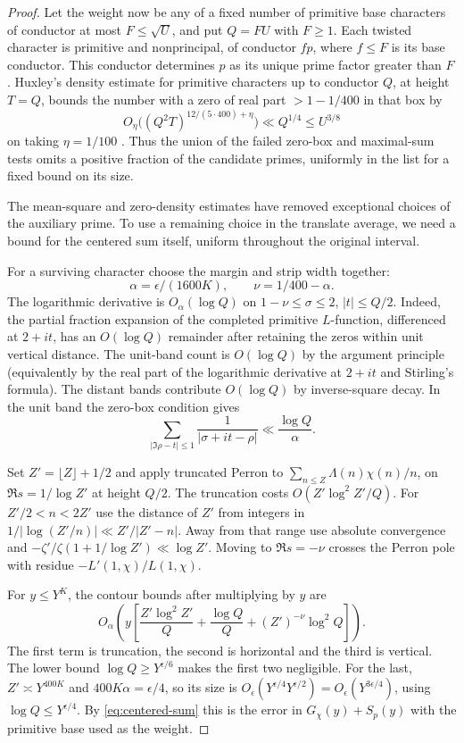 \begin{proof}
Let the weight now be any of a fixed number of primitive base
characters of conductor at most \(F\le\sqrt U\), and put \(Q=FU\)
with \(F\ge1\). Each twisted character is primitive and
nonprincipal, of conductor \(fp\), where \(f\le F\) is its base
conductor. This conductor determines \(p\) as its unique prime
factor greater than \(F\). Huxley's density estimate for primitive
characters up to conductor \(Q\), at height \(T=Q\), bounds the
number with a zero of real part \(>1-1/400\) in that box by
\[
 O_\eta\big((Q^2 T)^{12/(5\cdot400)+\eta}\big)
                 \ll Q^{1/4}\le U^{3/8}
\]
on taking \(\eta=1/100\) \cite[(1.1)]{huxley}. Thus the union of
the failed zero-box and maximal-sum tests omits a positive
fraction of the candidate primes, uniformly in the list for a
fixed bound on its size.

The mean-square and zero-density estimates have removed exceptional choices of the auxiliary prime. To use a remaining choice in the translate average, we need a bound for the centered sum itself, uniform throughout the original interval.

For a surviving character choose the margin and strip width together:
\[
 \alpha=\epsilon/(1600K),\qquad \nu=1/400-\alpha.
\]
The logarithmic derivative is
\(O_\alpha(\log Q)\) on \(1-\nu\le\sigma\le 2\),
\(|t|\le Q/2\). Indeed, the partial fraction expansion of the
completed primitive \(L\)-function, differenced at \(2+it\),
has an \(O(\log Q)\) remainder after retaining the zeros within
unit vertical distance. The unit-band count is \(O(\log Q)\)
by the argument principle (equivalently by the real part of the
logarithmic derivative at \(2+it\) and Stirling's formula).
The distant bands contribute \(O(\log Q)\) by inverse-square decay. In the unit band the zero-box condition gives
\[
 \sum_{|\Im\rho-t|\le1}\frac{1}{|\sigma+it-\rho|}\ll \frac{\log Q}{\alpha}.
\]


Set \(Z'=\lfloor Z\rfloor+1/2\) and apply truncated Perron to
\(\sum_{n\le Z}\Lambda(n)\chi(n)/n\), on
\(\Re s=1/\log Z'\) at height \(Q/2\). The truncation costs
\(O(Z'\log^2 Z'/Q)\). For \(Z'/2<n<2Z'\) use the
distance of \(Z'\) from integers in
\(1/|\log(Z'/n)|\ll Z'/|Z'-n|\). Away from that range use
absolute convergence and \(-\zeta'/\zeta(1+1/\log Z')
\ll\log Z'\). Moving to \(\Re s=-\nu\) crosses the Perron pole
with residue \(-L'(1,\chi)/L(1,\chi)\).

For \(y\le Y^K\), the contour bounds after multiplying by \(y\) are
\[
 O_\alpha\!\left(y\left[
   \frac{Z'\log^2Z'}{Q}
   +\frac{\log Q}{Q}
   +(Z')^{-\nu}\log^2 Q\right]\right).
\]
The first term is truncation, the second is horizontal and the third
is vertical. The lower bound \(\log Q\ge Y^{\epsilon/6}\) makes
the first two negligible. For the last, \(Z'\asymp Y^{400K}\)
and \(400K\alpha=\epsilon/4\), so its size is
\(O_\epsilon(Y^{\epsilon/4}Y^{\epsilon/2})=
O_\epsilon(Y^{3\epsilon/4})\), using \(\log Q\le Y^{\epsilon/4}\).
By \eqref{eq:centered-sum} this is the error in \(G_\chi(y)+S_p(y)\)
with the primitive base used as the weight.


\end{proof}

